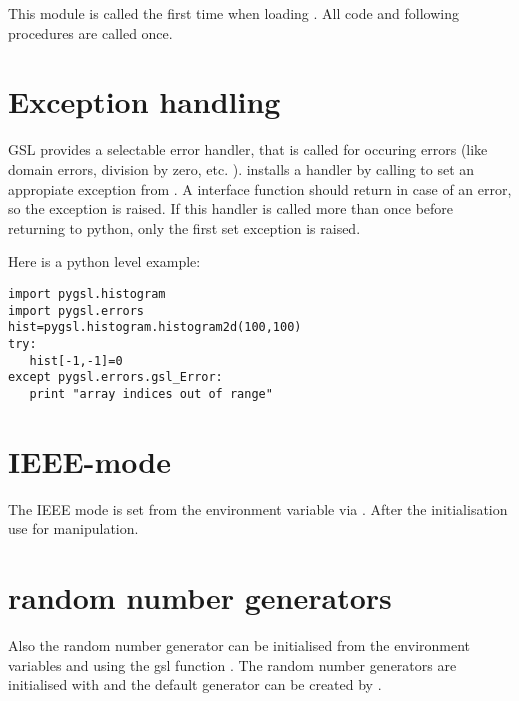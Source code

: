
This module is called the first time when loading .
All code and following procedures are called once.

\section{Exception handling}

GSL provides a selectable error handler, that is called for occuring errors (like domain errors, division by zero, etc. ).
 installs a handler by calling  to set an appropiate exception from .
A  interface function should return  in case of an error, so the exception is raised.
If this handler is called more than once before returning to python, only the first set exception is raised.

Here is a python level example:

\begin{verbatim}
import pygsl.histogram
import pygsl.errors
hist=pygsl.histogram.histogram2d(100,100)
try:
   hist[-1,-1]=0
except pygsl.errors.gsl_Error:
   print "array indices out of range"
\end{verbatim}

\section{IEEE-mode}

The IEEE mode is set from the environment variable  via .
After the initialisation use  for manipulation.

\section{random number generators}

Also the random number generator can be initialised from the environment variables  and
 using the gsl function .
The random number generators are initialised with  and the default generator can be created by .
